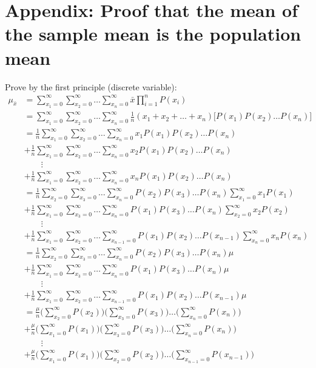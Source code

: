 \documentclass[12pt,a4paper]{report}
\begin{document}
\section{Appendix: Proof that the mean of the sample mean is the population mean} \label{proof_mean}
Prove by the first principle (discrete variable):
\begin{align*}
\mu_{\bar{x}}
&= \sum_{x_1 = 0}^{\infty} \sum_{x_2 = 0}^{\infty} \dots \sum_{x_n = 0}^{\infty} \bar{x} \prod_{i = 1}^{n} P(x_i) \\
&= \sum_{x_1 = 0}^{\infty} \sum_{x_2 = 0}^{\infty} \dots \sum_{x_n = 0}^{\infty} \frac{1}{n} ( x_1 + x_2 + \dots + x_n) \Big[ P(x_1) P(x_2) \dots P(x_n) \Big] \\
&= \frac{1}{n} \sum_{x_1 = 0}^{\infty} \sum_{x_2 = 0}^{\infty} \dots \sum_{x_n = 0}^{\infty} x_1 P(x_1) P(x_2) \dots P(x_n) \\
&+ \frac{1}{n} \sum_{x_1 = 0}^{\infty} \sum_{x_2 = 0}^{\infty} \dots \sum_{x_n = 0}^{\infty} x_2 P(x_1) P(x_2) \dots P(x_n) \\
& \qquad \vdots \\
&+ \frac{1}{n} \sum_{x_1 = 0}^{\infty} \sum_{x_2 = 0}^{\infty} \dots \sum_{x_n = 0}^{\infty} x_n P(x_1) P(x_2) \dots P(x_n) \\
&= \frac{1}{n} \sum_{x_2 = 0}^{\infty} \sum_{x_3 = 0}^{\infty} \dots \sum_{x_n = 0}^{\infty} P(x_2) P(x_3) \dots P(x_n) \sum_{x_1 = 0}^{\infty} x_1 P(x_1) \\
&+ \frac{1}{n} \sum_{x_1 = 0}^{\infty} \sum_{x_3 = 0}^{\infty} \dots \sum_{x_n = 0}^{\infty} P(x_1) P(x_3) \dots P(x_n) \sum_{x_2 = 0}^{\infty} x_2 P(x_2) \\
& \qquad \vdots \\
&+ \frac{1}{n} \sum_{x_1 = 0}^{\infty} \sum_{x_2 = 0}^{\infty} \dots \sum_{x_{n-1} = 0}^{\infty} P(x_1) P(x_2) \dots P(x_{n-1}) \sum_{x_n = 0}^{\infty} x_n P(x_n) \\
&= \frac{1}{n} \sum_{x_2 = 0}^{\infty} \sum_{x_3 = 0}^{\infty} \dots \sum_{x_n = 0}^{\infty} P(x_2) P(x_3) \dots P(x_n) \mu \\
&+ \frac{1}{n} \sum_{x_1 = 0}^{\infty} \sum_{x_3 = 0}^{\infty} \dots \sum_{x_n = 0}^{\infty} P(x_1) P(x_3) \dots P(x_n) \mu \\
& \qquad \vdots \\
&+ \frac{1}{n} \sum_{x_1 = 0}^{\infty} \sum_{x_2 = 0}^{\infty} \dots \sum_{x_{n-1} = 0}^{\infty} P(x_1) P(x_2) \dots P(x_{n-1}) \mu \\
&= \frac{\mu}{n} \Bigg( \sum_{x_2 = 0}^{\infty} P(x_2) \Bigg) \Bigg( \sum_{x_3 = 0}^{\infty} P(x_3) \Bigg) \dots \Bigg( \sum_{x_n = 0}^{\infty} P(x_n) \Bigg) \\
&+ \frac{\mu}{n} \Bigg( \sum_{x_1 = 0}^{\infty} P(x_1) \Bigg) \Bigg( \sum_{x_3 = 0}^{\infty} P(x_3) \Bigg) \dots \Bigg( \sum_{x_n = 0}^{\infty} P(x_n) \Bigg) \\
& \qquad \vdots \\
&+ \frac{\mu}{n} \Bigg( \sum_{x_1 = 0}^{\infty} P(x_1) \Bigg) \Bigg( \sum_{x_2 = 0}^{\infty} P(x_2) \Bigg) \dots \Bigg( \sum_{x_{n-1} = 0}^{\infty} P(x_{n-1}) \Bigg)
\end{align*}
\end{document}
